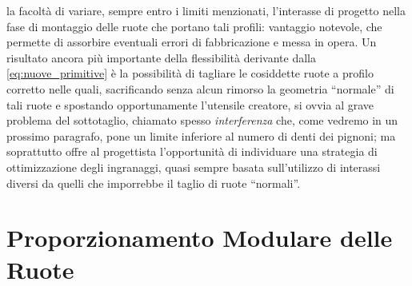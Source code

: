la facolt\`a di variare, sempre entro i limiti menzionati,
 l'interasse di progetto
nella fase di montaggio delle ruote che portano tali profili:
vantaggio notevole, che permette di assorbire eventuali errori
di fabbricazione e messa in opera. Un risultato ancora pi\`u importante
della flessibilit\`a derivante dalla \ref{eq:nuove_primitive} \`e
la possibilit\`a di tagliare
le cosiddette ruote a profilo corretto nelle quali, sacrificando
senza alcun rimorso la geometria ``normale''  di tali ruote e spostando
opportunamente l'utensile creatore, si ovvia al grave problema del sottotaglio,
chiamato spesso {\em interferenza} che, come vedremo in un prossimo
paragrafo, pone un limite inferiore al numero di denti dei pignoni; ma
soprattutto offre al progettista l'opportunit\`a di individuare una strategia
di ottimizzazione degli ingranaggi, quasi sempre basata sull'utilizzo di
interassi diversi da quelli che imporrebbe il taglio di ruote ``normali''.


\section{Proporzionamento Modulare delle Ruote}

